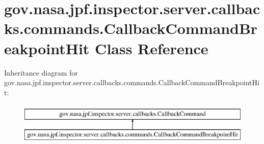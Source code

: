 \hypertarget{classgov_1_1nasa_1_1jpf_1_1inspector_1_1server_1_1callbacks_1_1commands_1_1_callback_command_breakpoint_hit}{}\section{gov.\+nasa.\+jpf.\+inspector.\+server.\+callbacks.\+commands.\+Callback\+Command\+Breakpoint\+Hit Class Reference}
\label{classgov_1_1nasa_1_1jpf_1_1inspector_1_1server_1_1callbacks_1_1commands_1_1_callback_command_breakpoint_hit}
Inheritance diagram for gov.\+nasa.\+jpf.\+inspector.\+server.\+callbacks.\+commands.\+Callback\+Command\+Breakpoint\+Hit\+:\begin{figure}[H]
\begin{center}
\leavevmode
\includegraphics[height=2.000000cm]{classgov_1_1nasa_1_1jpf_1_1inspector_1_1server_1_1callbacks_1_1commands_1_1_callback_command_breakpoint_hit}
\end{center}
\end{figure}
